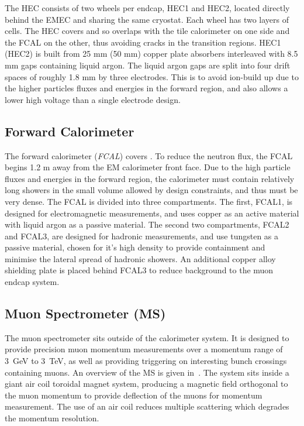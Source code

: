 The HEC consists of two wheels per endcap, HEC1 and HEC2, located directly
behind the EMEC and sharing the same cryostat. Each wheel has two layers of
cells. The HEC covers  and so overlaps with the tile
calorimeter on one side and the FCAL on the other, thus avoiding cracks in the
transition regions. HEC1 (HEC2) is built from 25 mm (50 mm) copper plate
absorbers interleaved with 8.5 mm gaps containing liquid argon. The liquid
argon gaps are split into four drift spaces of roughly 1.8 mm by three
electrodes. This is to avoid ion-build up due to the higher particles fluxes
and energies in the forward region, and also allows a lower high voltage than a single
electrode design.

\subsection{Forward Calorimeter}

The forward calorimeter ({\it FCAL}) covers . To reduce the
neutron flux, the FCAL begins 1.2 m away from the EM calorimeter
front face. Due to the high particle fluxes and energies in the forward region,
the calorimeter must contain relatively long showers in the small volume allowed
by design constraints, and thus must be very dense. The FCAL is divided into
three compartments. The first, FCAL1, is designed for electromagnetic
measurements, and uses copper as an active material with liquid argon as a
passive material. The second two compartments, FCAL2 and FCAL3, are designed for hadronic
measurements, and use tungsten as a passive material, chosen for it's high
density to provide containment and minimise the lateral spread of hadronic
showers. An additional copper alloy shielding plate is placed behind FCAL3 to
reduce background to the muon endcap system.

\subsection{Muon Spectrometer (MS)}

The muon spectrometer sits outside of the calorimeter system. It is designed to
provide precision muon momentum measurements over a momentum range of 3~GeV to
3~TeV, as well as providing triggering on interesting bunch crossings containing
muons. An overview of the MS is given in~. The system sits
inside a giant air coil toroidal magnet system, producing a magnetic field
orthogonal to the muon momentum to provide deflection of the
muons for momentum measurement. The use of an air coil reduces multiple
scattering which degrades the momentum resolution.

